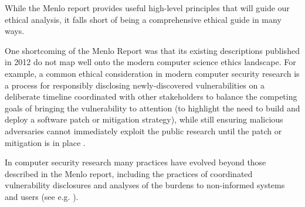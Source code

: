 While the Menlo report provides useful high-level principles that will guide our ethical analysis, it falls short of being a comprehensive ethical guide in many ways.

One shortcoming of the Menlo Report was that its existing descriptions published in 2012 do not map well onto the modern computer science ethics landscape.
For example, a common ethical consideration in modern computer security research is a process for responsibly disclosing newly-discovered vulnerabilities on a deliberate timeline coordinated with other stakeholders to balance the competing goals of bringing the vulnerability to attention (to highlight the need to build and deploy a software patch or mitigation strategy), while still ensuring malicious adversaries cannot immediately exploit the public research until the patch or mitigation is in place
\cite{ISOIEC29147,householderCERTGuideCoordinated,VulnerabilityDisclosureOWASP}.

In computer security research many practices have evolved beyond those described in the Menlo report, including the practices of coordinated vulnerability disclosures \cite{ISOIEC29147,householderCERTGuideCoordinated,VulnerabilityDisclosureOWASP} and analyses of the burdens to non-informed systems and users (see e.g. \cite[App.\ B]{demirSimilarityWebMeasurements2023}).




